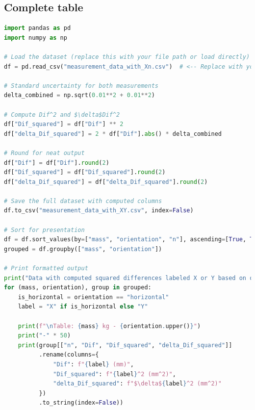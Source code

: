 \documentclass[a4paper,11pt]{article}
\begin{document}
\subsection{Complete table}
\begin{lstlisting}[language=Python]
import pandas as pd
import numpy as np

# Load the dataset (replace this with your file path or load directly)
df = pd.read_csv("measurement_data_with_Xn.csv")  # <-- Replace with your actual file name

# Standard uncertainty for both measurements
delta_combined = np.sqrt(0.01**2 + 0.01**2)

# Compute Dif^2 and $\delta$Dif^2
df["Dif_squared"] = df["Dif"] ** 2
df["delta_Dif_squared"] = 2 * df["Dif"].abs() * delta_combined

# Round for neat output
df["Dif"] = df["Dif"].round(2)
df["Dif_squared"] = df["Dif_squared"].round(2)
df["delta_Dif_squared"] = df["delta_Dif_squared"].round(2)

# Save the full dataset with computed columns
df.to_csv("measurement_data_with_XY.csv", index=False)

# Sort for presentation
df = df.sort_values(by=["mass", "orientation", "n"], ascending=[True, True, False])
grouped = df.groupby(["mass", "orientation"])

# Print formatted output
print("Data with computed squared differences labeled X or Y based on orientation:\n")
for (mass, orientation), group in grouped:
    is_horizontal = orientation == "horizontal"
    label = "X" if is_horizontal else "Y"
    
    print(f"\nTable: {mass} kg - {orientation.upper()}")
    print("-" * 50)
    print(group[["n", "Dif", "Dif_squared", "delta_Dif_squared"]]
          .rename(columns={
              "Dif": f"{label} (mm)",
              "Dif_squared": f"{label}^2 (mm^2)",
              "delta_Dif_squared": f"$\delta${label}^2 (mm^2)"
          })
          .to_string(index=False))

\end{lstlisting}
\label{Code: 2}

\newpage
\end{document}
